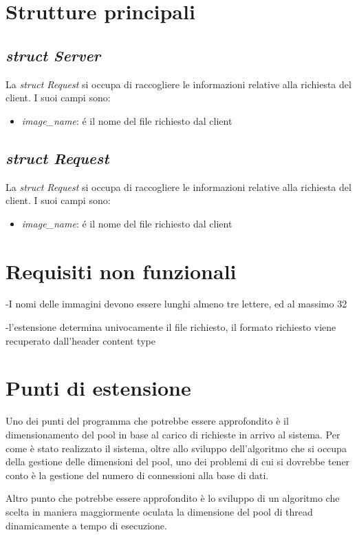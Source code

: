 \documentclass[paper=a4, oneside, fontsize=14pt, titlepage]{article}
\begin{document}
	\section{Strutture principali}
		\subsection{\textit{struct Server}}
	\begin{flushleft}
		La \textit{struct Request} si occupa di raccogliere le informazioni relative alla richiesta del client. I suoi campi sono:
		\begin{itemize}
			\item \textit{image\_name}: \'{e} il nome del file richiesto dal client
		\end{itemize}
	\end{flushleft}
	\subsection{\textit{struct Request}}
	\begin{flushleft}
		La \textit{struct Request} si occupa di raccogliere le informazioni relative alla richiesta del client. I suoi campi sono:
		\begin{itemize}
			\item \textit{image\_name}: \'{e} il nome del file richiesto dal client
		\end{itemize}
	\end{flushleft}
	
	\section{Requisiti non funzionali}
	\begin{flushleft}
		-I nomi delle immagini devono essere lunghi almeno tre lettere, ed al massimo 32

		-l'estensione determina univocamente il file richiesto, il formato richiesto viene recuperato dall'header content type
	\end{flushleft}
	\section{Punti di estensione}
	\begin{flushleft}
		Uno dei punti del programma che potrebbe essere approfondito è il dimensionamento del pool in base al carico di richieste in arrivo al sistema. Per come è stato realizzato il sistema, oltre allo sviluppo dell'algoritmo che si occupa della gestione delle dimensioni del pool, uno dei problemi di cui si dovrebbe tener conto è la gestione del numero di connessioni alla base di dati.\newline
		
		Altro punto che potrebbe essere approfondito è lo sviluppo di un algoritmo che scelta in maniera maggiormente oculata la dimensione del pool di thread dinamicamente a tempo di esecuzione.
	\end{flushleft}	
\end{document}

